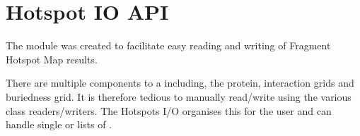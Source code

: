 \documentclass[letterpaper,10pt,english]{sphinxmanual}
\begin{document}
\begin{fulllineitems}
\begin{fulllineitems}
\begin{sphinxVerbatim}[commandchars=\\\{\}]
  
\end{sphinxVerbatim}

\begin{sphinxVerbatim}[commandchars=\\\{\}]
  
  
    
  
\end{sphinxVerbatim}

\end{fulllineitems}


\end{fulllineitems}



\chapter{Hotspot IO API}
\label{\detokenize{hs_io_api:module-hotspots.hs_io}}\label{\detokenize{hs_io_api:hotspot-io-api}}\label{\detokenize{hs_io_api::doc}}
The {\hyperref[\detokenize{hs_io_api:module-hotspots.hs_io}]{}} module was created to facilitate easy reading and
writing of Fragment Hotspot Map results.

There are multiple components to a  including, the
protein, interaction grids and buriedness grid. It is therefore tedious to manually
read/write using the various class readers/writers. The Hotspots I/O organises this
for the user and can handle single  or lists of
.
\end{document}
